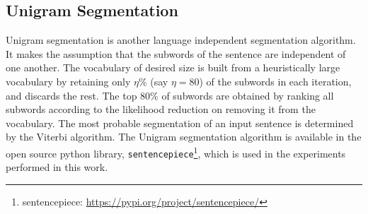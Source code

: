 \subsection{Unigram  Segmentation}

Unigram segmentation \cite{kudo-2018-subword} is another language independent
segmentation algorithm. It makes the assumption that the subwords of the
sentence are independent of one another. The vocabulary of desired size is
built from a heuristically large vocabulary by retaining only $\eta \%$ (say
$\eta =80$) of the subwords in each iteration, and discards the rest. The top
$80\%$ of subwords are obtained by ranking all subwords according to the
likelihood reduction on removing it from the vocabulary. The most probable
segmentation of an input sentence is determined by the Viterbi algorithm. The
Unigram segmentation algorithm is available in the open source python library,
\texttt{sentencepiece}\footnote{sentencepiece:
    \url{https://pypi.org/project/sentencepiece/}}, which is used in the
experiments performed in this work.





